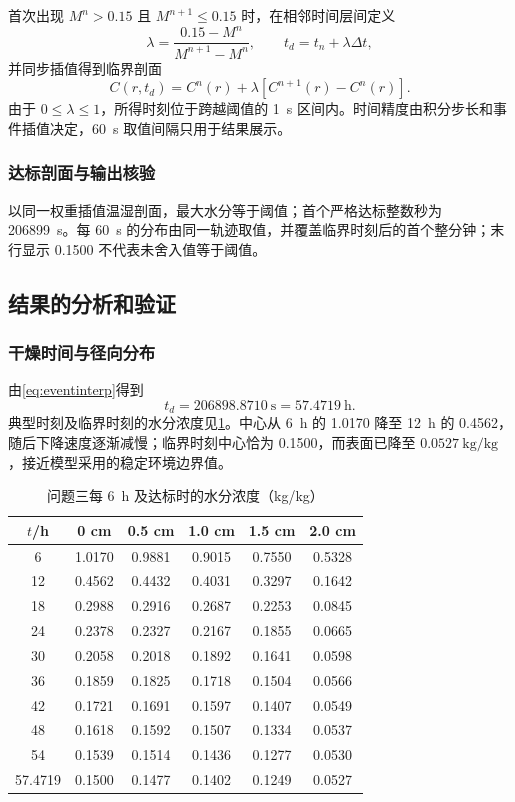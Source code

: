 首次出现 $M^n>0.15$ 且 $M^{n+1}\le0.15$ 时，在相邻时间层间定义
\begin{equation}
\lambda=\frac{0.15-M^n}{M^{n+1}-M^n},\qquad
t_d=t_n+\lambda\Delta t,
\label{eq:eventinterp}
\end{equation}
并同步插值得到临界剖面
\begin{equation}
C(r,t_d)=C^n(r)+\lambda[C^{n+1}(r)-C^n(r)].
\label{eq:profileinterp}
\end{equation}
由于 $0\le\lambda\le1$，所得时刻位于跨越阈值的 1~s 区间内。时间精度由积分步长和事件插值决定，60~s 取值间隔只用于结果展示。

\subsubsection{达标剖面与输出核验}

以同一权重插值温湿剖面，最大水分等于阈值；首个严格达标整数秒为 206899~s。每 60~s 的分布由同一轨迹取值，并覆盖临界时刻后的首个整分钟；末行显示 0.1500 不代表未舍入值等于阈值。

\subsection{结果的分析和验证}

\subsubsection{干燥时间与径向分布}

由\cref{eq:eventinterp}得到
\begin{equation}
t_d=206898.8710~\mathrm{s}=57.4719~\mathrm{h}.
\label{eq:q3time}
\end{equation}
典型时刻及临界时刻的水分浓度见\cref{tab:q3}。中心从 6~h 的 1.0170 降至 12~h 的 0.4562，随后下降速度逐渐减慢；临界时刻中心恰为 0.1500，而表面已降至 $0.0527~\mathrm{kg/kg}$，接近模型采用的稳定环境边界值。

\begin{table}[!htbp]
\centering
\caption{问题三每 6~h 及达标时的水分浓度（kg/kg）}\label{tab:q3}
\begin{tabular}{cccccc}
\toprule
$t$/h&0 cm&0.5 cm&1.0 cm&1.5 cm&2.0 cm\\
\midrule
6&1.0170&0.9881&0.9015&0.7550&0.5328\\
12&0.4562&0.4432&0.4031&0.3297&0.1642\\
18&0.2988&0.2916&0.2687&0.2253&0.0845\\
24&0.2378&0.2327&0.2167&0.1855&0.0665\\
30&0.2058&0.2018&0.1892&0.1641&0.0598\\
36&0.1859&0.1825&0.1718&0.1504&0.0566\\
42&0.1721&0.1691&0.1597&0.1407&0.0549\\
48&0.1618&0.1592&0.1507&0.1334&0.0537\\
54&0.1539&0.1514&0.1436&0.1277&0.0530\\
57.4719&0.1500&0.1477&0.1402&0.1249&0.0527\\
\bottomrule
\end{tabular}
\end{table}

